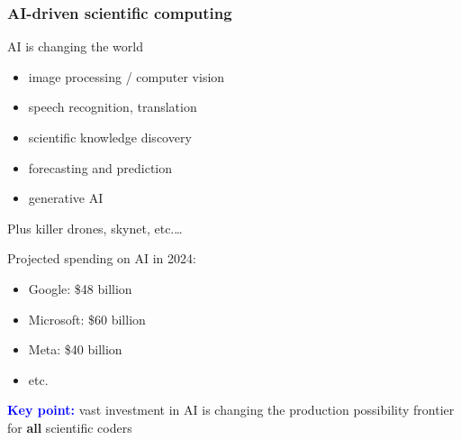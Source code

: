 \documentclass[
    xcolor={svgnames,dvipsnames},
    hyperref={colorlinks, citecolor=DeepPink4, linkcolor=DarkRed, urlcolor=DarkBlue}
    ]{beamer}  %
\newcommand{\navy}[1]{\textcolor{Blue}{\bf #1}}
\newcommand{\emp}[1]{\textcolor{DarkOrange1}{\bf #1}}
\newcommand{\1}{\mathbbm 1}
\begin{document}
\begin{frame}
    \frametitle{AI-driven scientific computing}

    AI is changing the world

    \begin{itemize}
        \item image processing / computer vision
        \vspace{0.5em}
        \item speech recognition, translation
        \vspace{0.5em}
        \item scientific knowledge discovery
        \vspace{0.5em}
        \item forecasting and prediction 
        \vspace{0.5em}
        \item generative AI
    \end{itemize}

    \pause

        \vspace{0.5em}
        \vspace{0.5em}
        \vspace{0.5em}
    Plus killer drones, skynet, etc.\ldots

    
\end{frame}

\begin{frame}
    
    Projected spending on AI in 2024:

    \begin{itemize}
        \item Google: \$48 billion
        \vspace{0.5em}
        \item Microsoft: \$60 billion
        \vspace{0.5em}
        \item Meta: \$40 billion
        \vspace{0.5em}
        \item etc.
    \end{itemize}

    \pause
        \vspace{0.5em}
        \vspace{0.5em}
        \vspace{0.5em}
        \vspace{0.5em}
        \navy{Key point:} vast investment in AI is changing the production
        possibility frontier for \emp{all} scientific coders

\end{frame}
\end{document}
